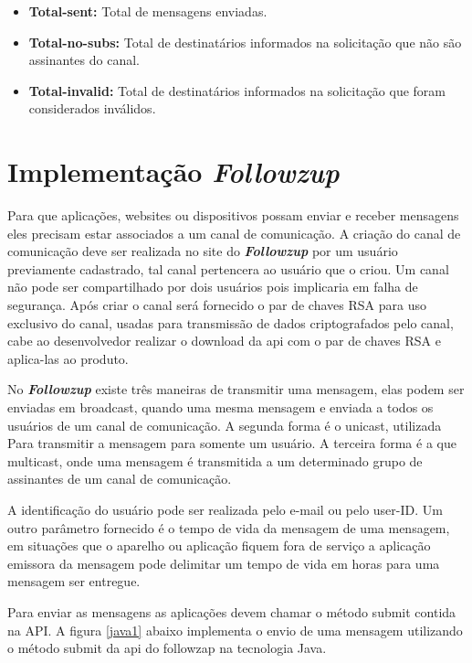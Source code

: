 \documentclass[12pt]{article}
\begin{document}
\begin{itemize}
   
\item \textbf{Total-sent:} Total de mensagens enviadas.
\item \textbf{Total-no-subs:} Total de destinatários informados na solicitação que não são assinantes do canal.
 \item \textbf{Total-invalid:} Total de destinatários informados na solicitação que foram considerados inválidos. 
\end{itemize}

\section{Implementação \textit{\textbf{Followzup }}}

Para que aplicações, websites ou dispositivos possam enviar e receber mensagens eles precisam estar associados a um canal de comunicação. A criação do canal de comunicação deve ser realizada no site do \textit{\textbf{Followzup }}por um usuário previamente cadastrado, tal canal pertencera ao usuário que o criou. Um canal não pode ser compartilhado por dois usuários pois implicaria em falha de segurança.
Após criar o canal será fornecido o par de chaves RSA para uso exclusivo do canal, usadas para transmissão de dados criptografados pelo canal, cabe ao desenvolvedor realizar o download da api com o par de chaves RSA e aplica-las ao produto.



No \textit{\textbf{Followzup }}existe três maneiras de transmitir uma mensagem, elas podem ser enviadas em  broadcast, quando uma mesma mensagem e enviada a todos os usuários de um canal de comunicação. A segunda forma é o unicast, utilizada Para transmitir a mensagem para somente um usuário. A terceira forma é a que multicast, onde uma mensagem é transmitida a um determinado grupo de assinantes de um canal de comunicação.



A identificação do usuário pode ser realizada pelo e-mail ou pelo user-ID. Um outro parâmetro fornecido é o tempo de vida da mensagem de uma mensagem, em situações que o aparelho ou aplicação fiquem fora de serviço a aplicação emissora da mensagem pode delimitar um tempo de vida em horas para uma mensagem ser entregue.


Para enviar as mensagens as aplicações devem chamar o método submit contida na API. A figura \ref{java1} abaixo implementa o envio de uma mensagem utilizando o método submit da api do followzap na tecnologia Java.
\end{document}
